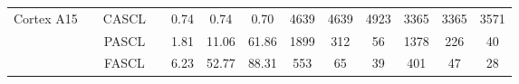 \documentclass[11pt]{report}
\begin{document}
\begin{table}[h]
{{\begin{tabular}{r|c|c|c c c c| c c c| c c c}
        \hline
        \multirow{3}{*}{\begin{minipage}{0.5in}\centering Cortex A15\end{minipage}}  & \multirow{3}{*}{\begin{minipage}{0.5in}\centering 2000\end{minipage}}
                                                                                     & CASCL                                                                                 &                                            & 0.74 & 0.74                                                      & 0.70                                              & 4639                                                       & 4639         & 4923         & 3365         & 3365         & 3571                        \\
                                                                                     &                                                                                       & PASCL                                      &      & 1.81                                                      & 11.06                                             & 61.86                                                      & 1899         & 312          & 56           & 1378         & 226          & 40           \\
                                                                                     &                                                                                       & FASCL                                      &      & 6.23                                                      & 52.77                                             & 88.31                                                      & 553          & 65           & 39           & 401          & 47           & 28           \\


\end{tabular}}}
\end{table}
\end{document}
